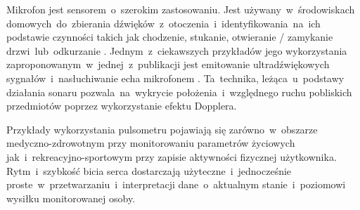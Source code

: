 Mikrofon jest sensorem~o~szerokim zastosowaniu. Jest używany~w~środowiskach domowych~do~zbierania dźwięków~z~otoczenia~i~identyfikowania~na~ich podstawie czynności takich jak chodzenie, stukanie, otwieranie / zamykanie drzwi~lub~odkurzanie \cite{S46}. Jednym~z~ciekawszych przykładów jego wykorzystania zaproponowanym~w~jednej~z~publikacji jest emitowanie ultradźwiękowych sygnałów~i~nasłuchiwanie echa mikrofonem \cite{S22}. Ta~technika, leżąca~u~podstawy działania sonaru pozwala~na~wykrycie położenia~i~względnego ruchu pobliskich przedmiotów poprzez wykorzystanie efektu Dopplera.

Przykłady wykorzystania pulsometru pojawiają się zarówno~w~obszarze medyczno-zdrowotnym \cite{S62} przy monitorowaniu parametrów życiowych jak~i~rekreacyjno-sportowym \cite{S51} przy zapisie aktywności fizycznej użytkownika. Rytm~i~szybkość bicia serca dostarczają użyteczne~i~jednocześnie proste~w~przetwarzaniu~i~interpretacji dane~o~aktualnym stanie~i~poziomowi wysiłku monitorowanej osoby.
